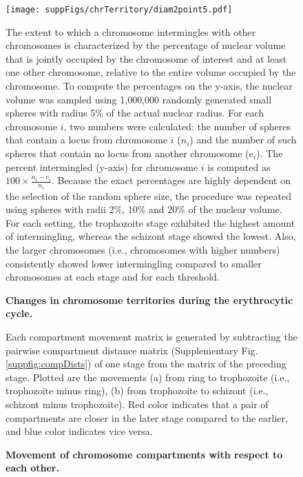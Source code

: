 \begin{figure}
  \begin{center}
  \texttt{[image: suppFigs/chrTerritory/diam2point5.pdf]}
   \end{center}
\caption{{\bf Changes in chromosome territories during the erythrocytic cycle.}}
{ The extent to which a chromosome intermingles with other chromosomes is
    characterized by the percentage of nuclear volume that is jointly occupied
    by the chromosome of interest and at least one other chromosome,
    relative to the entire volume occupied by the chromosome.
    To compute the percentages on the y-axis, the nuclear volume was sampled using
    1,000,000 randomly generated small spheres with radius 5\% of the actual nuclear
    radius. For each chromosome $i$, two numbers were calculated: the number of spheres that contain a locus
    from chromosome $i$ ($n_i$) and the number of such spheres that
    contain no locus from another chromosome ($e_i$). The percent intermingled (y-axis)
    for chromosome $i$ is computed as $100\times \frac{n_i-e_i}{n_i}$.
    Because the exact percentages are highly dependent on the selection of the random
    sphere size, the procedure was repeated using spheres with
    radii 2\%, 10\% and 20\% of the nuclear volume.  For each setting,
    the trophozoite stage exhibited the highest amount of intermingling,
    whereas the schizont stage showed the lowest. Also, the
    larger chromosomes (i.e., chromosomes with higher numbers)
    consistently showed lower intermingling compared to smaller
    chromosomes at each stage and for each threshold.}
\label{suppfig:territory}
\end{figure}
\clearpage


\begin{figure}
  \begin{center}
  \hspace{0.03\textwidth}
  \end{center}
\caption{{\bf Movement of chromosome compartments with respect to each other.}}
{ Each compartment movement matrix is generated by subtracting the pairwise compartment
    distance matrix (Supplementary Fig. \ref{suppfig:compDists}) of one stage from the
    matrix of the preceding stage. Plotted are the movements (a) from ring to trophozoite
    (i.e., trophozoite minus ring), (b) from trophozoite to schizont (i.e.,  schizont minus
    trophozoite). Red color indicates that a pair of compartments are closer in the later
    stage compared to the earlier, and blue color indicates vice versa.
}
\label{suppfig:compMovement}
\end{figure}
\clearpage


